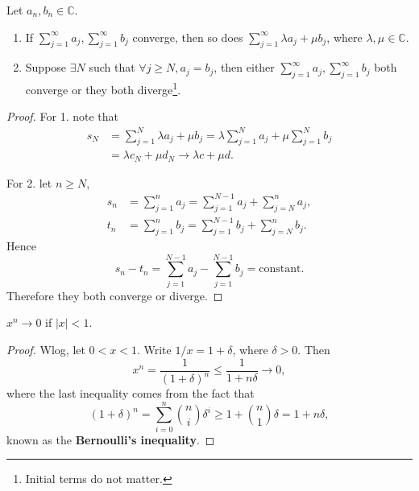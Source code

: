 \begin{lemma}\label{lma:1.6} 
    Let $ a_n,b_n\in \mathbb{C} $.
    \begin{enumerate}
        \item If $ \sum_{j=1}^{\infty}a_j,\sum_{j=1}^{\infty}b_j$ converge, then so does $ \sum_{j=1}^{\infty}\lambda a_j+\mu b_j$, where $ \lambda,\mu\in \mathbb{C} $.
        \item Suppose $ \exists N $ such that $ \forall j\ge N, a_j=b_j $, then either $ \sum_{j=1}^{\infty}a_j,\sum_{j=1}^{\infty}b_j$ both converge or they both diverge\footnote{Initial terms do not matter.}.
    \end{enumerate}
\end{lemma}
\begin{proof}
    For 1. note that 
    \begin{align*}
        s_N &= \sum_{j=1}^{N}\lambda a_j+\mu b_j = \lambda \sum_{j=1}^{N}a_j + \mu \sum_{j=1}^{N}b_j\\ 
        &= \lambda c_N + \mu d_N \to \lambda c+ \mu d.
    \end{align*}

    For 2. let $n\ge N$,
    \begin{align*}
        s_n &= \sum_{j=1}^{n} a_j = \sum_{j=1}^{N-1}a_j+\sum_{j=N}^{n}a_j,\\ 
        t_n &= \sum_{j=1}^{n} b_j = \sum_{j=1}^{N-1}b_j+\sum_{j=N}^{n}b_j.
    \end{align*}
    Hence 
    \[
        s_n-t_n = \sum_{j=1}^{N-1}a_j-\sum_{j=1}^{N-1}b_j=\text{constant}.
    \]
    Therefore they both converge or diverge.
\end{proof}

\begin{sprop}
    $ x^n\to 0 $ if $|x|<1$.
\end{sprop}
\begin{proof}
    Wlog, let $0<x<1$. Write $ 1/x=1+\delta $, where $ \delta>0 $. Then 
    \[
        x^n = \frac{1}{(1+\delta)^n}\le \frac{1}{1+n\delta}\to 0,
    \]
    where the last inequality comes from the fact that 
    \[
        (1+\delta)^{n} = \sum_{i=0}^{n} \binom{n}{i}\delta^i\ge 1+\binom{n}{1}\delta=1+n\delta,
    \]
    known as the \textbf{Bernoulli's inequality}.
\end{proof}

